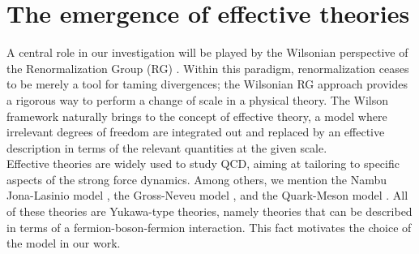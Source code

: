 \section{The emergence of effective theories}
A central role in our investigation will be played by the Wilsonian perspective of the Renormalization Group (RG) \cite{WilsonRG1,WilsonRG2,WILSON197475}. Within this paradigm, renormalization ceases to be merely a tool for taming divergences; 
the Wilsonian RG approach provides a rigorous way to perform a change of scale in a physical theory. The Wilson framework naturally brings to the concept of effective theory, a model where irrelevant degrees of freedom are integrated out and replaced by an effective description in terms of the relevant quantities at the given scale.  \\
Effective theories are widely used to study QCD, aiming at tailoring to specific aspects of the strong force dynamics. 
Among others, we mention the Nambu \textendash{} Jona-Lasinio model \cite{Nambu1961DynamicalI, Nambu1961DynamicalII}, the Gross-Neveu model \cite{grossneveu}, and the Quark-Meson model \cite{quarkmeson1,quarkmeson2,quarkmeson3}. All of these theories are Yukawa-type theories, namely theories that can be described in terms of a fermion-boson-fermion interaction. This fact motivates the choice of the model in our work.

\newpage
